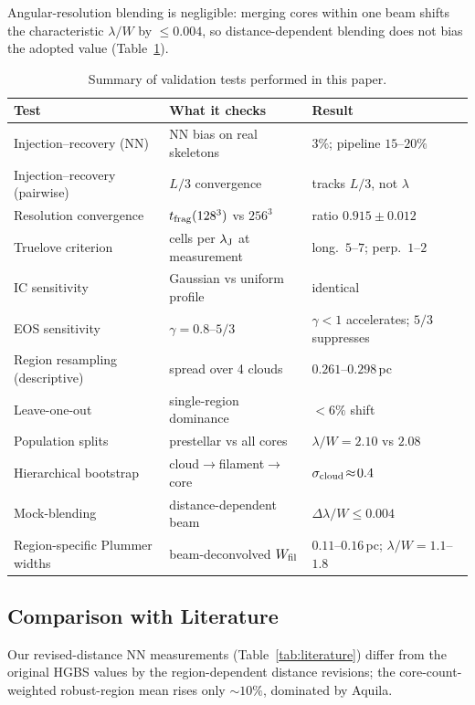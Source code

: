 \documentclass[usenatbib,twoside,twocolumn]{mnras}
\begin{document}
Angular-resolution blending is negligible: merging cores within one beam shifts the characteristic $\lambda/W$ by $\le0.004$, so distance-dependent blending does not bias the adopted value (Table~\ref{tab:validation_summary}).

\begin{table}
\caption{Summary of validation tests performed in this paper.}
\label{tab:validation_summary}
\footnotesize
\setlength{\tabcolsep}{3pt}
\begin{tabular}{p{2.4cm}p{2.8cm}p{2.0cm}}
\toprule
Test & What it checks & Result \\
\midrule
Injection--recovery (NN) & NN bias on real skeletons & $3\%$; pipeline $15$--$20\%$ \\
Injection--recovery (pairwise) & $L/3$ convergence & tracks $L/3$, not $\lambda$ \\
Resolution convergence & $t_{\rm frag}(128^3)$ vs $256^3$ & ratio $0.915\pm0.012$ \\
Truelove criterion & cells per $\lambda_{\rm J}$ at measurement & long.\ $5$--$7$; perp.\ $1$--$2$ \\
IC sensitivity & Gaussian vs uniform profile & identical \\
EOS sensitivity & $\gamma=0.8$--$5/3$ & $\gamma<1$ accelerates; $5/3$ suppresses \\
Region resampling (descriptive) & spread over 4 clouds & $0.261$--$0.298$\,pc \\
Leave-one-out & single-region dominance & $<6\%$ shift \\
Population splits & prestellar vs all cores & $\lambda/W\!=\!2.10$ vs $2.08$ \\
Hierarchical bootstrap & cloud$\to$filament$\to$core & $\sigma_{\rm cloud}\!\approx\!0.4$ \\
Mock-blending & distance-dependent beam & $\Delta\lambda/W\!\le\!0.004$ \\
Region-specific Plummer widths & beam-deconvolved $W_{\rm fil}$ & $0.11$--$0.16$\,pc; $\lambda/W\!=\!1.1$--$1.8$ \\
\bottomrule
\end{tabular}
\end{table}

\subsection{Comparison with Literature}

Our revised-distance NN measurements (Table~\ref{tab:literature}) differ from the original HGBS values by the region-dependent distance revisions; the core-count-weighted robust-region mean rises only $\sim10\%$, dominated by Aquila.
\end{document}
